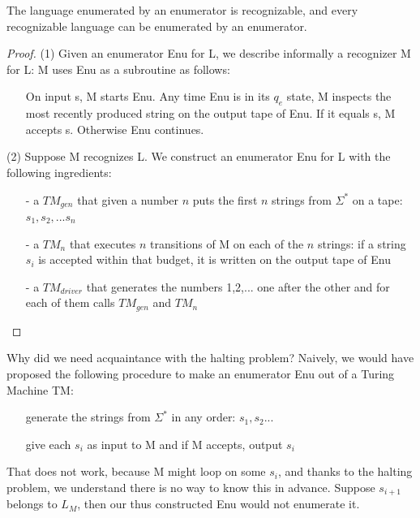 \begin{theorem}
The language enumerated by an enumerator is recognizable, and every
recognizable language can be enumerated by an enumerator.
\end{theorem}
\begin{proof}
(1) Given an enumerator Enu for L, we describe informally a recognizer
  M for L: M uses Enu as a subroutine as follows:
\begin{itemize}
\item[]
On input s, M starts Enu. Any time Enu is in its $q_e$ state, M
inspects the most recently produced string on the output tape of
Enu. If it equals s, M accepts s. Otherwise Enu continues.
\end{itemize}

(2) Suppose M recognizes L. We construct an enumerator Enu for L with the following ingredients:

\begin{itemize}
\item[-]
a $TM_{gen}$ that given a number $n$ puts the first $n$
strings from $\Sigma^*$ on a tape: $s_1, s_2, ... s_n$

\item[-]
a $TM_n$ that executes $n$ transitions
of M on each of the $n$ strings: if a string $s_i$ is accepted within that budget, it is written
on the output tape of Enu

\item[-]
a $TM_{driver}$ that generates the numbers 1,2,... one after the
other and for each of them calls $TM_{gen}$ and $TM_n$

\end{itemize}
\end{proof}

Why did we need acquaintance with the halting problem? Naively, we
would have proposed the following procedure to make an enumerator Enu
out of a Turing Machine TM:

\begin{itemize}
\item[]
generate the strings from $\Sigma^*$ in any order:
$s_1, s_2...$

\item[]
give each $s_i$ as input to M and if M accepts, output $s_i$
\end{itemize}

That does not work, because M might loop on some $s_i$, and thanks to
the halting problem, we understand there is no way to know this in
advance. Suppose $s_{i+1}$ belongs to $L_M$, then our thus constructed
Enu would not enumerate it.


